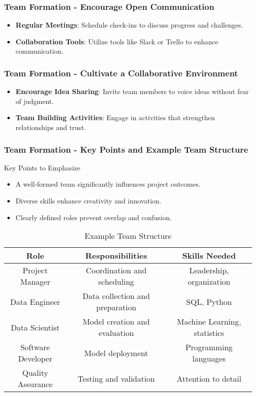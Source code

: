 \documentclass[aspectratio=169]{beamer}
\begin{document}
\begin{frame}[fragile]
    \frametitle{Team Formation - Encourage Open Communication}
    \begin{itemize}
        \item \textbf{Regular Meetings}: Schedule check-ins to discuss progress and challenges.
        \item \textbf{Collaboration Tools}: Utilize tools like Slack or Trello to enhance communication.
    \end{itemize}
\end{frame}

\begin{frame}[fragile]
    \frametitle{Team Formation - Cultivate a Collaborative Environment}
    \begin{itemize}
        \item \textbf{Encourage Idea Sharing}: Invite team members to voice ideas without fear of judgment.
        \item \textbf{Team Building Activities}: Engage in activities that strengthen relationships and trust.
    \end{itemize}
\end{frame}

\begin{frame}[fragile]
    \frametitle{Team Formation - Key Points and Example Team Structure}
    \begin{block}{Key Points to Emphasize}
        \begin{itemize}
            \item A well-formed team significantly influences project outcomes.
            \item Diverse skills enhance creativity and innovation.
            \item Clearly defined roles prevent overlap and confusion.
        \end{itemize}
    \end{block}

    \begin{table}[ht]
        \centering
        \begin{tabular}{|c|c|c|}
            \hline
            \textbf{Role} & \textbf{Responsibilities} & \textbf{Skills Needed} \\ \hline
            Project Manager & Coordination and scheduling & Leadership, organization \\ \hline
            Data Engineer & Data collection and preparation & SQL, Python \\ \hline
            Data Scientist & Model creation and evaluation & Machine Learning, statistics \\ \hline
            Software Developer & Model deployment & Programming languages \\ \hline
            Quality Assurance & Testing and validation & Attention to detail \\ \hline
        \end{tabular}
        \caption{Example Team Structure}
    \end{table}
\end{frame}
\end{document}
